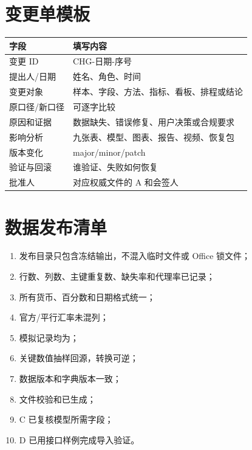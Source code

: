 \documentclass[UTF8,12pt,openany]{ctexbook}
\begin{document}
\chapter{变更单模板}
\begin{longtable}{p{3.4cm}p{10.5cm}}
\toprule
\textbf{字段} & \textbf{填写内容}\\
\midrule
变更 ID & CHG-日期-序号\\
提出人/日期 & 姓名、角色、时间\\
变更对象 & 样本、字段、方法、指标、看板、排程或结论\\
原口径/新口径 & 可逐字比较\\
原因和证据 & 数据缺失、错误修复、用户决策或合规要求\\
影响分析 & 九张表、模型、图表、报告、视频、恢复包\\
版本变化 & major/minor/patch\\
验证与回滚 & 谁验证、失败如何恢复\\
批准人 & 对应权威文件的 A 和会签人\\
\bottomrule
\end{longtable}

\chapter{数据发布清单}
\begin{enumerate}[label=\ensuremath{\square}]
  \item 发布目录只包含冻结输出，不混入临时文件或 Office 锁文件；
  \item 行数、列数、主键重复数、缺失率和代理率已记录；
  \item 所有货币、百分数和日期格式统一；
  \item 官方/平行汇率未混列；
  \item 模拟记录均为；
  \item 关键数值抽样回源，转换可逆；
  \item 数据版本和字典版本一致；
  \item 文件校验和已生成；
  \item C 已复核模型所需字段；
  \item D 已用接口样例完成导入验证。
\end{enumerate}
\end{document}
